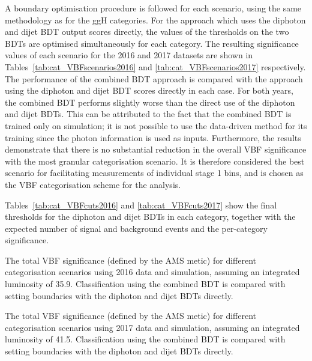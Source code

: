 A boundary optimisation procedure is followed for each scenario, 
using the same methodology as for the ggH categories.
For the approach which uses the diphoton and dijet BDT output scores directly, 
the values of the thresholds on the two BDTs are optimised simultaneously for each category.
The resulting significance values of each scenario for the 2016 and 2017 datasets 
are shown in Tables~\ref{tab:cat_VBFscenarios2016} and \ref{tab:cat_VBFscenarios2017} respectively.
The performance of the combined BDT approach is compared with the approach using the diphoton 
and dijet BDT scores directly in each case.
For both years, the combined BDT performs slightly worse 
than the direct use of the diphoton and dijet BDTs.
This can be attributed to the fact that the combined BDT is trained only on simulation; 
it is not possible to use the data-driven method for its training 
since the photon information is used as inputs.
Furthermore, the results demonstrate that there is no substantial reduction 
in the overall VBF significance with the most granular categorisation scenario.
It is therefore considered the best scenario for facilitating measurements of individual stage 1 bins, 
and is chosen as the VBF categorisation scheme for the analysis.

Tables~\ref{tab:cat_VBFcuts2016} and \ref{tab:cat_VBFcuts2017} show the final thresholds 
for the diphoton and dijet BDTs in each category, 
together with the expected number of signal and background events and the per-category significance.

\newpage

\begin{table}
  \begin{centering}
    
    \caption{The total VBF significance (defined by the AMS metic) for different categorisation scenarios 
    using 2016 data and simulation, assuming an integrated luminosity of \SI{35.9}{\fbinv}.
    Classification using the combined BDT is compared with setting boundaries with the 
    diphoton and dijet BDTs directly.}
    \label{tab:cat_VBFscenarios2016}
  \end{centering}
\end{table}

\begin{table}
  \begin{centering}
    
    \caption{The total VBF significance (defined by the AMS metic) for different categorisation scenarios 
    using 2017 data and simulation, assuming an integrated luminosity of \SI{41.5}{\fbinv}.
    Classification using the combined BDT is compared with setting boundaries with the 
    diphoton and dijet BDTs directly.}
    \label{tab:cat_VBFscenarios2017}
  \end{centering}
\end{table}

